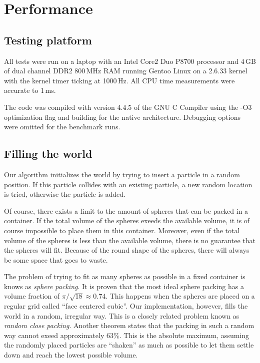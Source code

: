
\section{Performance}
\subsection{Testing platform}

All tests were run on a laptop with an Intel Core2 Duo P8700 processor and 
4\,GB of dual channel DDR2 800\,MHz RAM running Gentoo Linux on a 2.6.33 
kernel with the kernel timer ticking at 1000\,Hz. All CPU time measurements 
were accurate to 1\,ms.

The code was compiled with version 4.4.5 of the GNU C Compiler using the 
-O3 optimization flag and building for the native architecture. Debugging  
options were omitted for the benchmark runs.


\subsection{Filling the world}
Our algorithm initializes the world by trying to insert a particle in a 
random position. If this particle collides with an existing particle, a new 
random location is tried, otherwise the particle is added.

Of course, there exists a limit to the amount of spheres that can be packed 
in a container. If the total volume of the spheres exeeds the available 
volume, it is of course impossible to place them in this container.  
Moreover, even if the total volume of the spheres is less than the 
available volume, there is no guarantee that the spheres will fit. Because 
of the round shape of the spheres, there will always be some space that 
goes to waste.

The problem of trying to fit as many spheres as possible in a fixed 
container is knows as \emph{sphere packing}. It is proven\cite{idealPacking}
that the most ideal sphere packing has a volume fraction of $\pi / \sqrt{18}
\approx 0.74$. This happens when the spheres are placed on a regular grid
called  ``face centered cubic''. Our implementation, however, fills the 
world in a random, irregular way. This is a closely related problem known 
as \emph{random close packing}. Another theorem\cite{randomPacking} states 
that the packing in such a random way cannot exeed approximately 63\%. This 
is the absolute maximum, assuming the randomly placed particles are 
``shaken'' as much as possible to let them settle down and reach the lowest 
possible volume.

